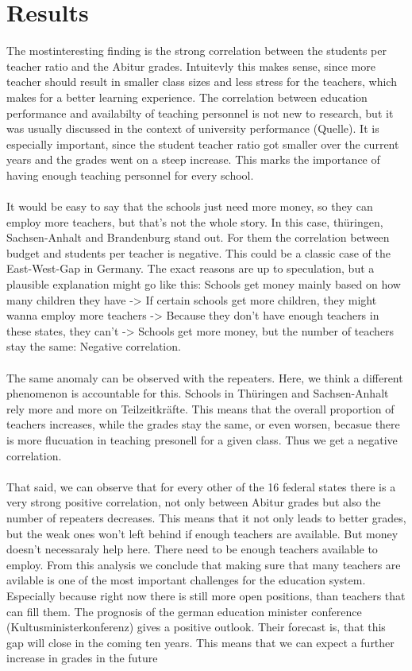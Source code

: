 \section*{Results}
The mostinteresting finding is the strong correlation between the students per teacher ratio and the Abitur grades. Intuitevly this makes sense, since more teacher should result in smaller class sizes and less stress for the teachers, which makes for a better learning experience. The correlation between education performance and availabilty of teaching personnel is not new to research, but it was usually discussed in the context of university performance (Quelle). It is especially important, since the student teacher ratio got smaller over the current years and the grades went on a steep increase. This marks the importance of having enough teaching personnel for every school.\\\\
It would be easy to say that the schools just need more money, so they can employ more teachers, but that's not the whole story. In this case, thüringen, Sachsen-Anhalt and Brandenburg stand out. For them the correlation between budget and students per teacher is negative. This could be a classic case of the East-West-Gap in Germany. The exact reasons are up to speculation, but a plausible explanation might go like this: Schools get money mainly based on how many children they have -> If certain schools get more children, they might wanna employ more teachers -> Because they don't have enough teachers in these states, they can't -> Schools get more money, but the number of teachers stay the same: Negative correlation.\\\\
The same anomaly can be observed with the repeaters. Here, we think a different phenomenon is accountable for this. Schools in Thüringen and Sachsen-Anhalt rely more and more on Teilzeitkräfte. This means that the overall proportion of teachers increases, while the grades stay the same, or even worsen, becasue there is more flucuation in teaching presonell for a given class. Thus we get a negative correlation.\\\\
That said, we can observe that for every other of the 16 federal states there is a very strong positive correlation, not only between Abitur grades but also the number of repeaters decreases. This means that it not only leads to better grades, but the weak ones won't left behind if enough teachers are available. But money doesn't necessaraly help here. There need to be enough teachers available to employ. From this analysis we conclude that making sure that many teachers are avilable is one of the most important challenges for the education system. Especially because right now there is still more open positions, than teachers that can fill them. The prognosis of the german education minister conference (Kultusministerkonferenz) gives a positive outlook. Their forecast is, that this gap will close in the coming ten years. This means that we can expect a further increase in grades in the future\\\\
